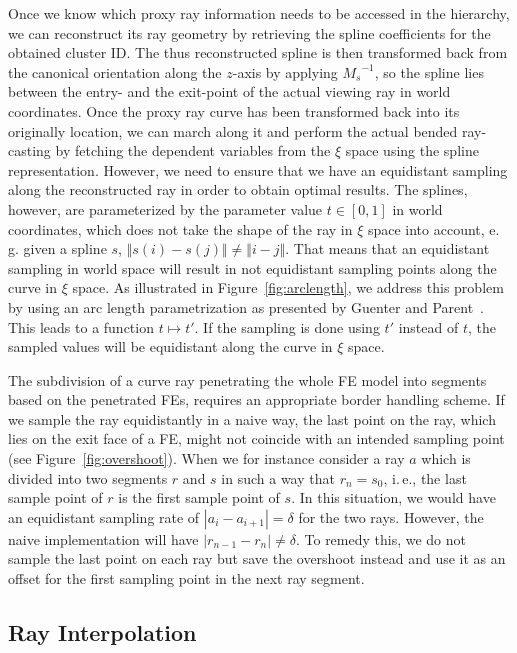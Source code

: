\documentclass[review,journal]{vgtc}         %
\begin{document}
Once we know which proxy ray information needs to be accessed in the hierarchy, we can reconstruct its ray geometry by retrieving the spline coefficients for the obtained cluster ID. The thus reconstructed spline is then transformed back from the canonical orientation along the $z$-axis by applying ${M_s}^{-1}$, so the spline lies between the entry- and the exit-point of the actual viewing ray in world coordinates. Once the proxy ray curve has been transformed back into its originally location, we can march along it and perform the actual bended ray-casting by fetching the dependent variables from the $\xi$ space using the spline representation. However, we need to ensure that we have an equidistant sampling along the reconstructed ray in order to obtain optimal results. The splines, however, are parameterized by the parameter value $t \in [0,1]$ in world coordinates, which does not take the shape of the ray in $\xi$ space into account, e.\,g. given a spline $s$, $\Vert s(i) - s(j) \Vert \neq \Vert i - j \Vert$. That means that an equidistant sampling in world space will result in not equidistant sampling points along the curve in $\xi$ space. As illustrated in Figure~\ref{fig:arclength}, we address this problem by using an arc length parametrization as presented by Guenter and Parent~\cite{guenter90arclength}. This leads to a function $t \mapsto t'$. If the sampling is done using $t'$ instead of $t$, the sampled values will be equidistant along the curve in $\xi$ space.

The subdivision of a curve ray penetrating the whole FE model into segments based on the penetrated FEs, requires an appropriate border handling scheme. If we sample the ray equidistantly in a naive way, the last point on the ray, which lies on the exit face of a FE, might not coincide with an intended sampling point (see Figure~\ref{fig:overshoot}). When we for instance consider a ray $a$ which is divided into two segments $r$ and $s$ in such a way that $r_n = s_0$, i.\,e., the last sample point of $r$ is the first sample point of $s$. In this situation, we would have an equidistant sampling rate of $\left|a_i - a_{i+1}\right| = \delta$ for the two rays. However, the naive implementation will have $\left|r_{n-1} - r_{n}\right| \neq \delta$. To remedy this, we do not sample the last point on each ray but save the overshoot instead and use it as an offset for the first sampling point in the next ray segment.

\subsection{Ray Interpolation}
\end{document}
